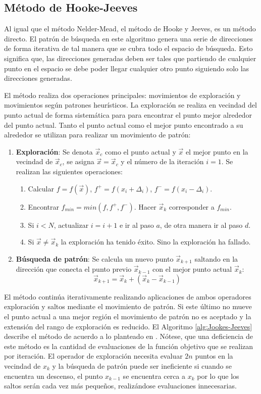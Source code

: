 \subsection{Método de Hooke-Jeeves}
Al igual que el método Nelder-Mead, el método de Hooke y Jeeves, es un método directo.  El patrón de búsqueda en este algoritmo genera una serie de direcciones de forma iterativa de tal manera que se cubra todo el espacio de búsqueda. Esto significa que, las direcciones generadas deben ser tales que partiendo de cualquier punto en el espacio se debe poder llegar cualquier otro punto siguiendo solo las direcciones generadas.

 El método realiza dos operaciones principales: movimientos de exploración y movimientos según patrones heurísticos. La exploración se realiza en vecindad del punto actual de forma sistemática para para encontrar el punto mejor alrededor del punto actual. Tanto el punto actual como el mejor punto encontrado a su alrededor se utilizan para realizar un movimiento de patrón:
\begin{enumerate}
\item \textbf{Exploración}: Se denota $\vec{x}_c$ como el punto actual y $\vec{x}$ el mejor punto en la vecindad de $\vec{x}_c$, se asigna $\vec{x}=\vec{x}_c$ y el número de la iteración $i=1$. Se realizan las siguientes operaciones:
\begin{enumerate}
\item Calcular $f=f(\vec{x})$, $f^+=f(x_i+ \Delta_i)$, $f^-=f(x_i- \Delta_i)$.
\item Encontrar $f_{min}= min(f,f^+,f^-)$. Hacer $\vec{x}_k$ corresponder a $f_{min}$.
\item Si $i<N$, actualizar $i=i+1$ e ir al paso $a$, de otra manera ir al paso $d$. 
\item Si $\vec{x} \neq \vec{x}_k$ la exploración ha tenido éxito. Sino la exploración ha fallado. \\ 
\end{enumerate}

\item \textbf{Búsqueda de patrón}: Se calcula un nuevo punto $\vec{x}_{k+1}$ saltando en la dirección que conecta el punto previo $\vec{x}_{k-1}$ con el mejor punto actual $\vec{x}_k$:
\begin{equation}
\vec{x}_{k+1}=\vec{x}_{k}+(\vec{x}_{k}-\vec{x}_{k-1})
\end{equation}
\end{enumerate}
El método continúa iterativamente realizando aplicaciones de ambos operadores exploración y saltos mediante el movimiento de patrón. Si este último no mueve el punto actual a una mejor región el movimiento de patrón no es aceptado y la extensión del rango de exploración es reducido. El Algoritmo \ref{alg:Jookes-Jeeves} describe el método de acuerdo a lo planteado en \cite{deb_optimization_2004}. Nótese, que una deficiencia de este método es la cantidad de evaluaciones de la función objetivo que se realizan por iteración. El operador de exploración necesita evaluar $2n$ puntos en la vecindad de $x_k$ y la búsqueda de patrón puede ser ineficiente si cuando se encuentra un descenso, el punto $x_{k-1}$ se encuentra cerca a $x_k$ por lo que los saltos serán cada vez más pequeños, realizándose evaluaciones innecesarias. 

